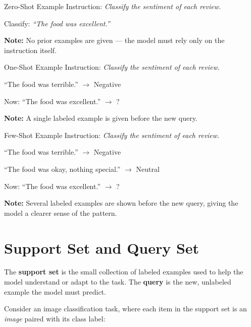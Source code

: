 \documentclass[11pt]{article}
\begin{document}
\begin{stepbox}{Zero-Shot Example}
Instruction: \; \emph{Classify the sentiment of each review.}

Classify: \; \emph{``The food was excellent.''}

\vspace{4pt}
\textcolor{accent}{\textbf{Note:}} No prior examples are given — the model must rely only on the instruction itself.
\end{stepbox}

\begin{stepbox}{One-Shot Example}
Instruction: \; \emph{Classify the sentiment of each review.}

``The food was terrible.'' $\rightarrow$ Negative

Now: \; ``The food was excellent.'' $\rightarrow$ ?

\vspace{4pt}
\textcolor{accent}{\textbf{Note:}} A single labeled example is given before the new query.
\end{stepbox}

\begin{stepbox}{Few-Shot Example}
Instruction: \; \emph{Classify the sentiment of each review.}

``The food was terrible.'' $\rightarrow$ Negative

``The food was okay, nothing special.'' $\rightarrow$ Neutral

Now: \; ``The food was excellent.'' $\rightarrow$ ?

\vspace{4pt}
\textcolor{accent}{\textbf{Note:}} Several labeled examples are shown before the new query, giving the model a clearer sense of the pattern.
\end{stepbox}


\section*{Support Set and Query Set}

The \textbf{support set} is the small collection of labeled examples used to help the model understand or adapt to the task. The \textbf{query} is the new, unlabeled example the model must predict.

Consider an image classification task, where each item in the support set is an \emph{image} paired with its class label:
\end{document}
